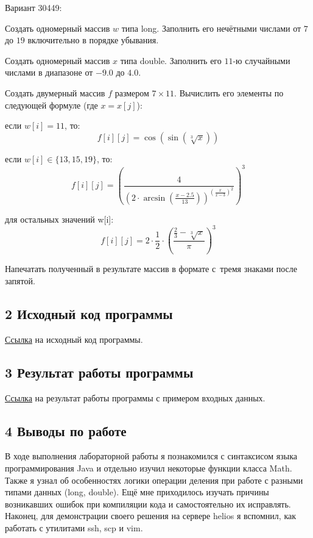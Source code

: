 \newpage
{\ital Вариант 30449:}
\begin{list*}[][\#]
\item Создать одномерный массив $w$ типа long. Заполнить его нечётными числами от $7$ до $19$ включительно в порядке убывания.
\item Создать одномерный массив $x$ типа double. Заполнить его $11$-ю случайными числами в диапазоне от $-9.0$ до $4.0$.
\item Создать двумерный массив $f$ размером $7\times 11$. Вычислить его элементы по следующей формуле {\ital (где $x=x[j]$)}:
\begin{list*}[2]
\item если $w[i] = 11$, то:
$$f[i][j]=\cos(\sin(\sqrt[3]{x}))$$
\item если $w[i]\in\{13,15,19\}$, то:
$$f[i][j]=\left(\frac{4}{\left(2\cdot\arcsin\left(\frac{x-2.5}{13}\right)\right)^{\left(\frac{x}{x-3}\right)^2}}\right)^3$$
\item для остальных значений w[i]:
$$f[i][j]=2\cdot\frac{1}{2}\cdot\left(\frac{\frac{2}{3}-\sqrt[3]{x}}{\pi}\right)^3$$
\end{list*}
\item Напечатать полученный в результате массив в формате с~тремя знаками после запятой.
\end{list*}

\subsection{2 Исходный код программы}

\href{https://github.com/MrDvD/itmo_labs/blob/master/lab1/lab1.java}{Ссылка} на исходный код программы.

\subsection{3 Результат работы программы}

\href{https://github.com/MrDvD/itmo_labs/blob/master/lab1/file.out}{Ссылка} на результат работы программы с примером входных данных.

\newpage
\subsection{4 Выводы по работе}

В ходе выполнения лабораторной работы я познакомился с синтаксисом языка программирования Java и отдельно изучил некоторые функции класса Math. Также я узнал об особенностях логики операции деления при работе с разными типами данных {\ital (long, double)}. Ещё мне приходилось изучать причины возникавших ошибок при компиляции кода и самостоятельно их исправлять. Наконец, для демонстрации своего решения на сервере helios я вспомнил, как работать с утилитами {\ital ssh}, {\ital scp} и {\ital vim}.



